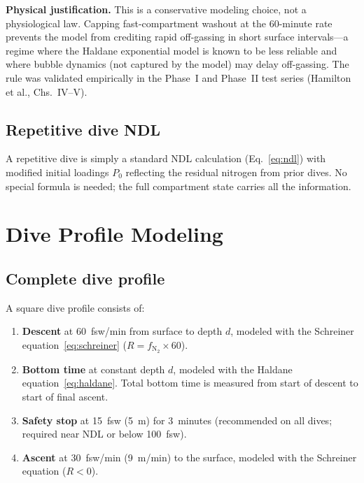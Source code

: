 \documentclass[11pt,letterpaper]{article}
\begin{document}
\textbf{Physical justification.}
This is a conservative modeling choice, not a physiological law.
Capping fast-compartment washout at the 60-minute rate prevents the model
from crediting rapid off-gassing in short surface intervals---a regime
where the Haldane exponential model is known to be less reliable and where
bubble dynamics (not captured by the model) may delay off-gassing.  The
rule was validated empirically in the Phase~I and Phase~II test series
(Hamilton et al., Chs.~IV--V).

\subsection{Repetitive dive NDL}

A repetitive dive is simply a standard NDL calculation
(Eq.~\ref{eq:ndl}) with modified initial loadings $P_0$ reflecting
the residual nitrogen from prior dives.  No special formula is needed;
the full compartment state carries all the information.


\section{Dive Profile Modeling}

\subsection{Complete dive profile}

A square dive profile consists of:
\begin{enumerate}[label=(\arabic*)]
  \item \textbf{Descent} at 60~fsw/min from surface to depth $d$,
        modeled with the Schreiner equation~\eqref{eq:schreiner}
        ($R = f_{\mathrm{N}_2} \times 60$).
  \item \textbf{Bottom time} at constant depth $d$, modeled with
        the Haldane equation~\eqref{eq:haldane}.
        Total bottom time is measured from start of descent to
        start of final ascent.
  \item \textbf{Safety stop} at 15~fsw (5~m) for 3~minutes (recommended
        on all dives; required near NDL or below 100~fsw).
  \item \textbf{Ascent} at 30~fsw/min (9~m/min) to the surface,
        modeled with the Schreiner equation ($R < 0$).
\end{enumerate}
\end{document}
